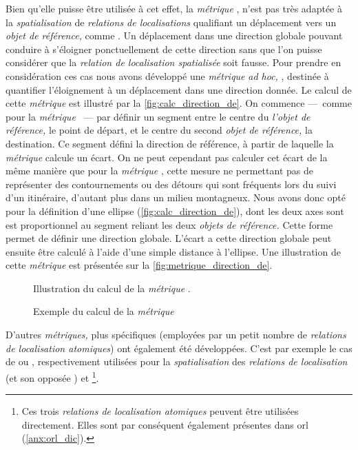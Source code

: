 Bien qu'elle puisse être utilisée à cet effet, la \emph{métrique}
, n'est pas très adaptée à la
\emph{spatialisation} de \emph{relations de localisations} qualifiant
un déplacement vers un \emph{objet de référence,} comme
. Un déplacement dans une direction
globale pouvant conduire à s'éloigner ponctuellement de cette
direction sans que l'on puisse considérer que la \emph{relation de
  localisation spatialisée} soit fausse. Pour prendre en considération
ces cas nous avons développé une \emph{métrique} \emph{ad hoc,}
, destinée à quantifier l'éloignement à un
déplacement dans une direction donnée. Le calcul de cette
\emph{métrique} est illustré par la
\autoref{fig:calc_direction_de}. On commence ---~comme pour la
\emph{métrique} ~--- par définir un segment
entre le centre du \emph{l'objet de référence,} le point de départ, et
le centre du second \emph{objet de référence,} la destination. Ce
segment défini la direction de référence, à partir de laquelle la
\emph{métrique} calcule un écart. On ne peut cependant pas calculer
cet écart de la même manière que pour la \emph{métrique}
, cette mesure ne permettant pas de représenter
des contournements ou des détours qui sont fréquents lors du suivi
d'un itinéraire, d'autant plus dans un milieu montagneux. Nous avons
donc opté pour la définition d'une ellipse
(\autoref{fig:calc_direction_de}), dont les deux axes sont est
proportionnel au segment reliant les deux \emph{objets de référence.}
Cette forme permet de définir une direction globale. L'écart a cette
direction globale peut ensuite être calculé à l'aide d'une simple
distance à l'ellipse. Une illustration de cette \emph{métrique} est
présentée sur la \autoref{fig:metrique_direction_de}.

\begin{figure}
  \centering
  
  \caption{Illustration du calcul de la \emph{métrique}
    \protect{}.}
  \label{fig:calc_direction_de}
\end{figure}

\begin{figure}
  \centering
  
  \caption{Exemple du calcul de la \emph{métrique}
    \protect{}}
  \label{fig:metrique_direction_de}
\end{figure}

D'autres \emph{métriques,} plus spécifiques (\ie employées par un
petit nombre de \emph{relations de localisation atomiques}) ont
également été développées. C'est par exemple le cas de
 ou , respectivement
utilisées pour la \emph{spatialisation} des \emph{relations de
  localisation}  (et son opposée
) et 
\footnote{Ces trois \emph{relations de localisation atomiques} peuvent
  être utilisées directement. Elles sont par conséquent également
  présentes dans \ac{orl} (\autoref{anx:orl_dic}).}.

